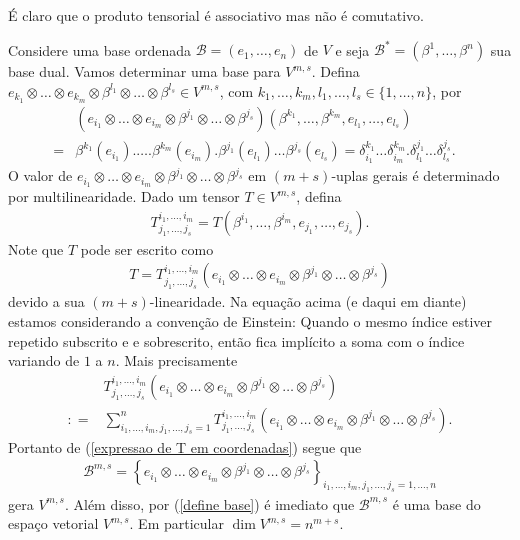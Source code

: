 \documentclass[10pt,reqno]{amsart}
\begin{document}
É claro que o produto tensorial é associativo mas não é comutativo.

Considere uma base ordenada $\mathcal B = (e_1, \ldots, e_n)$ de $V$ e seja $\mathcal B^\ast = (\beta^1, \ldots, \beta^n)$ sua base dual.
Vamos determinar uma base para $V^{m,s}$.
Defina $e_{k_1} \otimes \ldots \otimes e_{k_m} \otimes \beta^{l_1} \otimes \ldots \otimes \beta^{l_s} \in V^{m,s}$, com $k_1, \ldots, k_m, l_1, \ldots, l_s\in \{1, \ldots, n\}$, por 
\begin{align}
& (e_{i_1} \otimes \ldots \otimes e_{i_m} \otimes \beta^{j_1} \otimes \ldots \otimes \beta^{j_s})(\beta^{k_1}, \ldots, \beta^{k_m}, e_{l_1}, \ldots, e_{l_s}) & \nonumber \\
= 
&
\beta^{k_1}(e_{i_1}).\ldots.\beta^{k_m}(e_{i_m}).\beta^{j_1}(e_{l_1}) \ldots \beta^{j_s}(e_{l_s}) 
=
\delta^{k_1}_{i_1}\ldots \delta^{k_m}_{i_m}. \delta^{j_1}_{l_1} \ldots \delta^{j_s}_{l_s}. & \label{define base}
\end{align}
O valor de $e_{i_1} \otimes \ldots \otimes e_{i_m} \otimes \beta^{j_1} \otimes \ldots \otimes \beta^{j_s}$ em $(m+s)$-uplas gerais é determinado por multilinearidade.
Dado um tensor $T \in V^{m,s}$,
defina
\begin{align*}
T^{i_1, \ldots, i_m}_{j_1, \ldots, j_s} = T(\beta^{i_1}, \ldots, \beta^{i_m}, e_{j_1}, \ldots, e_{j_s}).
\end{align*} 
Note que $T$ pode ser escrito como  
\begin{align}
\label{expressao de T em coordenadas}
T = T^{i_1, \ldots, i_m}_{j_1, \ldots, j_s}(e_{i_1} \otimes \ldots \otimes e_{i_m} \otimes \beta^{j_1} \otimes \ldots \otimes \beta^{j_s})
\end{align}
devido a sua $(m+s)$-linearidade.
Na equação acima (e daqui em diante) estamos considerando a convenção de Einstein: Quando o mesmo índice estiver repetido subscrito e e sobrescrito, então fica implícito a soma com o índice variando de $1$ a $n$.
Mais precisamente
\begin{align*}
& 
T^{i_1, \ldots, i_m}_{j_1, \ldots, j_s}(e_{i_1} \otimes \ldots \otimes e_{i_m} \otimes \beta^{j_1} \otimes \ldots \otimes \beta^{j_s}) \\
: = 
&
\sum_{i_1, \ldots, i_m, j_1, \ldots, j_s = 1}^n T^{i_1, \ldots, i_m}_{j_1, \ldots, j_s}(e_{i_1} \otimes \ldots \otimes e_{i_m} \otimes \beta^{j_1} \otimes \ldots \otimes \beta^{j_s}).
\end{align*}
Portanto de (\ref{expressao de T em coordenadas}) segue que
\begin{align*}
\mathcal B^{m,s}=\left\{ e_{i_1} \otimes \ldots \otimes e_{i_m} \otimes \beta^{j_1} \otimes \ldots \otimes \beta^{j_s} \right\}_{i_1, \ldots, i_m, j_1, \ldots, j_s = 1, \ldots, n}
\end{align*}
gera $V^{m,s}$.
Além disso, por (\ref{define base}) é imediato que $\mathcal B^{m,s}$ é uma base do espaço vetorial $V^{m,s}$.
Em particular $\dim V^{m,s} = n^{m+s}$. 
\end{document}
